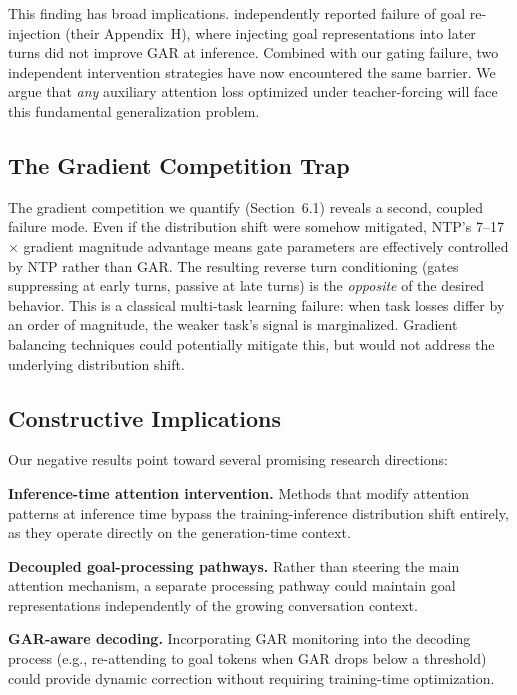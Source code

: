 \documentclass[11pt,a4paper]{article}
\begin{document}
This finding has broad implications.
\citet{dongre2026} independently reported failure of goal re-injection (their Appendix~H), where injecting goal representations into later turns did not improve GAR at inference.
Combined with our gating failure, two independent intervention strategies have now encountered the same barrier.
We argue that \emph{any} auxiliary attention loss optimized under teacher-forcing will face this fundamental generalization problem.

\subsection{The Gradient Competition Trap}

The gradient competition we quantify (Section~6.1) reveals a second, coupled failure mode.
Even if the distribution shift were somehow mitigated, NTP's 7--17$\times$ gradient magnitude advantage means gate parameters are effectively controlled by NTP rather than GAR.
The resulting reverse turn conditioning (gates suppressing at early turns, passive at late turns) is the \emph{opposite} of the desired behavior.
This is a classical multi-task learning failure: when task losses differ by an order of magnitude, the weaker task's signal is marginalized.
Gradient balancing techniques \citep{chen2018gradnorm} could potentially mitigate this, but would not address the underlying distribution shift.

\subsection{Constructive Implications}

Our negative results point toward several promising research directions:

\textbf{Inference-time attention intervention.}
Methods that modify attention patterns at inference time \citep{li2023inference} bypass the training-inference distribution shift entirely, as they operate directly on the generation-time context.

\textbf{Decoupled goal-processing pathways.}
Rather than steering the main attention mechanism, a separate processing pathway could maintain goal representations independently of the growing conversation context.

\textbf{GAR-aware decoding.}
Incorporating GAR monitoring into the decoding process (e.g., re-attending to goal tokens when GAR drops below a threshold) could provide dynamic correction without requiring training-time optimization.
\end{document}
